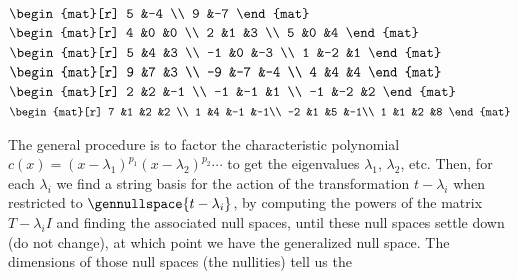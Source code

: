 \begin{exercises}
\begin{exparts*}
      \partsitem 
        \(
        \begin{mat}[r]
           5   &-4 \\
           9   &-7
        \end{mat} \)
      \partsitem 
        \(
        \begin{mat}[r]
           4   &0    &0  \\
           2   &1    &3  \\
           5   &0    &4
        \end{mat} \)
      \partsitem 
        \(
        \begin{mat}[r]
           5   &4    &3  \\
          -1   &0    &-3 \\
           1   &-2   &1
        \end{mat} \)
      \partsitem
        \(
        \begin{mat}[r]
           9   &7    &3  \\
          -9   &-7   &-4 \\
           4   &4    &4
        \end{mat} \)
      \partsitem 
        \(
        \begin{mat}[r]
           2   &2    &-1 \\
          -1   &-1   &1  \\
          -1   &-2   &2
        \end{mat} \)
      \partsitem 
        \(
        \begin{mat}[r]
           7   &1    &2   &2 \\
           1   &4    &-1  &-1\\
          -2   &1    &5   &-1\\
           1   &1    &2   &8
        \end{mat} \)
    \end{exparts*}
    \begin{answer}
      The general procedure is to factor the characteristic polynomial 
      $c(x)=(x-\lambda_1)^{p_1}(x-\lambda_2)^{p_2}\cdots $ 
      to get the eigenvalues $\lambda_1$, $\lambda_2$, etc. 
      Then, for each $\lambda_i$ we find a 
      string basis for the action of the transformation $t-\lambda_i$
      when restricted to $\gennullspace{t-\lambda_i}$,
      by computing the powers of the matrix $T-\lambda_iI$ and finding
      the associated null spaces, until these null spaces settle down
      (do not change), at which point we have the generalized null space.
      The dimensions of those null spaces (the nullities) tell us the

\end{answer}
\end{exercises}
